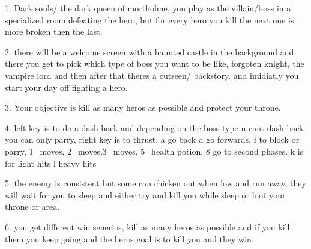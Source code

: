 1. Dark souls/ the dark queen of mortholme, you play as the villain/boss in a specialized room defeating the hero,
 but for every hero you kill the next one is 
more broken then the last.

2. there will be a welcome screen with a haunted castle in the background and there you get to pick which type of boss you want to be like, 
forgoten knight, the vampire lord and then after that theres a cutseen/ backstory.
and imidiatly you start your day off fighting a hero.

3. Your objective is kill as many heros as possible and protect your throne.

4. left key is to do a dash back and depending on the boss type u cant dash back you can only parry, 
right key is to thrust, a go back d go forwards. 
f to block or parry, 1=moves, 2=moves,3=moves, 5=health potion, 8 go to second phases. k is for light hits l heavy hits

5. the enemy is consistent but some can chicken out when low and run away, they will wait 
for you to sleep and either try and kill you while sleep or loot 
your throne or area.

6. you get different win senerios, kill as many heros as possible and if you kill them you keep going and the heros goal is to kill you and
they win